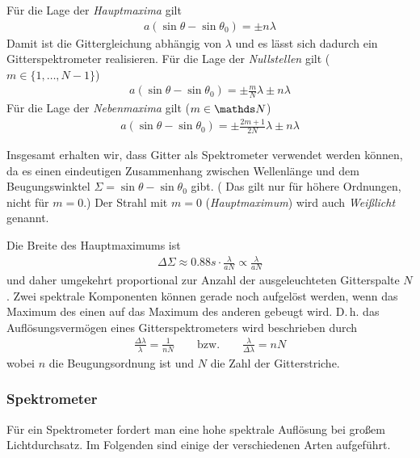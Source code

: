 Für die Lage der \emph{Hauptmaxima} gilt
\begin{gather*}
  a(\sin\theta-\sin\theta_0) = \pm n\lambda
\end{gather*}
Damit ist die Gittergleichung abhängig von $\lambda$ und es lässt sich
dadurch ein Gitterspektrometer realisieren.
Für die Lage der \emph{Nullstellen} gilt ($m\in\{1,\dotsc,N-1\}$)
\begin{gather*}
  a(\sin\theta-\sin\theta_0) = \pm \frac{m}{N}\lambda \pm n\lambda
\end{gather*}
Für die Lage der \emph{Nebenmaxima} gilt ($m\in\N$)
\begin{gather*}
  a(\sin\theta-\sin\theta_0) = \pm \frac{2m+1}{2N}\lambda \pm n\lambda
\end{gather*}

Insgesamt erhalten wir, dass Gitter als Spektrometer verwendet werden
können, da es einen eindeutigen Zusammenhang zwischen Wellenlänge und
dem Beugungswinktel $\Sigma = \sin\theta-\sin\theta_0$ gibt.
( Das gilt nur für höhere Ordnungen, nicht für $m=0$.)
Der Strahl mit $m=0$ (\emph{Hauptmaximum}) wird
auch \emph{Weißlicht} genannt.

Die Breite des Hauptmaximums ist
\begin{gather*}
  \Delta\Sigma 
  \approx \num{0,88}s\cdot \frac{\lambda}{aN} 
  \propto \frac{\lambda}{aN} 
\end{gather*}
und daher umgekehrt proportional zur Anzahl der ausgeleuchteten
Gitterspalte $N$.
Zwei spektrale Komponenten können gerade noch aufgelöst werden, wenn
das Maximum des einen auf das Maximum des anderen gebeugt wird.
D.\,h. das Auflösungsvermögen eines Gitterspektrometers wird
beschrieben durch
\begin{gather*}
  \frac{\Delta\lambda}{\lambda} = \frac{1}{nN}
  \qquad\text{bzw.}\qquad
  \frac{\lambda}{\Delta\lambda} = nN
\end{gather*}
wobei $n$ die Beugungsordnung ist 
und $N$ die Zahl der Gitterstriche.


\subsubsection{Spektrometer}
Für ein Spektrometer fordert man eine hohe spektrale Auflösung bei
großem Lichtdurchsatz.
Im Folgenden sind einige der verschiedenen Arten aufgeführt.

